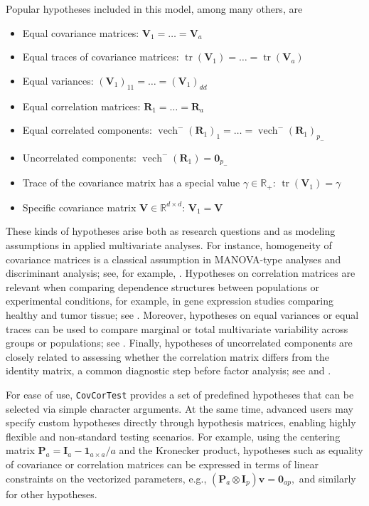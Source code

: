 Popular hypotheses included in this model, among many others, are

\begin{itemize}
\item
  Equal covariance matrices:
  \(\boldsymbol{V}_1 = \dots = \boldsymbol{V}_a\)
\item
  Equal traces of covariance matrices:
  \(\operatorname{tr}(\boldsymbol{V}_1) = \dots = \operatorname{tr}(\boldsymbol{V}_a)\)
\item
  Equal variances:
  \((\boldsymbol{V}_1)_{11} = \dots = (\boldsymbol{V}_1)_{dd}\)
\item
  Equal correlation matrices:
  \(\boldsymbol{R}_1 = \dots = \boldsymbol{R}_a\)
\item
  Equal correlated components:
  \(\operatorname{vech}^{-}(\boldsymbol{R}_1)_1 = \dots = \operatorname{vech}^{-}(\boldsymbol{R}_1)_{p_-}\)
\item
  Uncorrelated components:
  \(\operatorname{vech}^{-}(\boldsymbol{R}_1) = \mathbf{0}_{p_-}\)
\item
  Trace of the covariance matrix has a special value
  \(\gamma \in \mathbb{R}_+\):
  \(\operatorname{tr}(\boldsymbol{V}_1) = \gamma\)
\item
  Specific covariance matrix
  \(\boldsymbol{V} \in \mathbb{R}^{d \times d}\):
  \(\boldsymbol{V}_1 = \boldsymbol{V}\)
\end{itemize}

These kinds of hypotheses arise both as research questions and as modeling assumptions in applied multivariate analyses. For instance, homogeneity of covariance matrices is a classical assumption in MANOVA-type analyses and discriminant analysis; see, for example, \citet{FriendlySigal2020}. Hypotheses on correlation matrices are relevant when comparing dependence structures between populations or experimental conditions, for example, in gene expression studies comparing healthy and tumor tissue; see \citet{CaballeEtAl2018}. Moreover, hypotheses on equal variances or equal traces can be used to compare marginal or total multivariate variability across groups or populations; see \citet{LeMaitreMitteroecker2019}. Finally, hypotheses of uncorrelated components are closely related to assessing whether the correlation matrix differs from the identity matrix, a common diagnostic step before factor analysis; see \citet{Bartlett1951} and \citet{Revelle2019}.

For ease of use, \texttt{CovCorTest} provides a set of predefined hypotheses that
can be selected via simple character arguments. At the same time, advanced
users may specify custom hypotheses directly through hypothesis matrices,
enabling highly flexible and non-standard testing scenarios. For example, using the centering matrix
\(\boldsymbol{P}_a = \boldsymbol{I}_a - \mathbf{1}_{a \times a} / a\) and the Kronecker product, hypotheses
such as equality of covariance or correlation matrices can be expressed in terms
of linear constraints on the vectorized parameters, e.g.,
\((\boldsymbol{P}_a \otimes \boldsymbol{I}_p)\boldsymbol{v} = \mathbf{0}_{ap},\)
and similarly for other hypotheses.

